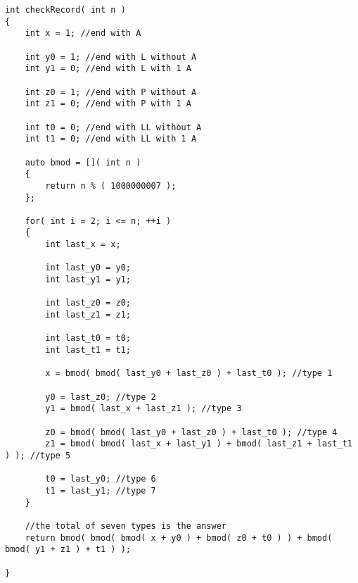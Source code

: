 \setcounter{lstlisting}{0}
\begin{lstlisting}[style=customc, caption={Dynamic Programming}]
int checkRecord( int n )
{
    int x = 1; //end with A

    int y0 = 1; //end with L without A
    int y1 = 0; //end with L with 1 A

    int z0 = 1; //end with P without A
    int z1 = 0; //end with P with 1 A

    int t0 = 0; //end with LL without A
    int t1 = 0; //end with LL with 1 A

    auto bmod = []( int n )
    {
        return n % ( 1000000007 );
    };

    for( int i = 2; i <= n; ++i )
    {
        int last_x = x;

        int last_y0 = y0;
        int last_y1 = y1;

        int last_z0 = z0;
        int last_z1 = z1;

        int last_t0 = t0;
        int last_t1 = t1;

        x = bmod( bmod( last_y0 + last_z0 ) + last_t0 ); //type 1

        y0 = last_z0; //type 2
        y1 = bmod( last_x + last_z1 ); //type 3

        z0 = bmod( bmod( last_y0 + last_z0 ) + last_t0 ); //type 4
        z1 = bmod( bmod( last_x + last_y1 ) + bmod( last_z1 + last_t1 ) ); //type 5

        t0 = last_y0; //type 6
        t1 = last_y1; //type 7
    }

    //the total of seven types is the answer
    return bmod( bmod( bmod( x + y0 ) + bmod( z0 + t0 ) ) + bmod( bmod( y1 + z1 ) + t1 ) );

}
\end{lstlisting}